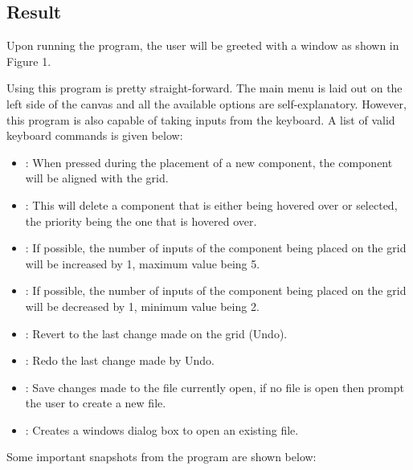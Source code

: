\documentclass[report.tex]{subfiles}
\begin{document}
\begin{large}
\section*{Result}
	Upon running the program, the user will be greeted with a window as shown in Figure 1. 

Using this program is pretty straight-forward. The main menu is laid out on the left side of the canvas and all the available options are self-explanatory. However, this program is also capable of taking inputs from the keyboard. A list of valid keyboard commands is given below:
    \begin{itemize}
        \item{ : When pressed during the placement of a new component, the component will be aligned with the grid.}
        \item{: This will delete a component that is either being hovered over or selected, the priority being the one that is hovered over.}
        \item{ : If possible, the number of inputs of the component being placed on the grid will be increased by 1, maximum value being 5.}
        \item{ : If possible, the number of inputs of the component being placed on the grid will be decreased by 1, minimum value being 2.}
        \item{: Revert to the last change made on the grid (Undo).}
        \item{: Redo the last change made by Undo.}
        \item{: Save changes made to the file currently open, if no file is open then prompt the user to create a new file.}
        \item{: Creates a windows dialog box to open an existing file.}
    \end{itemize}

Some important snapshots from the program are shown below:

\end{large}
\end{document}
